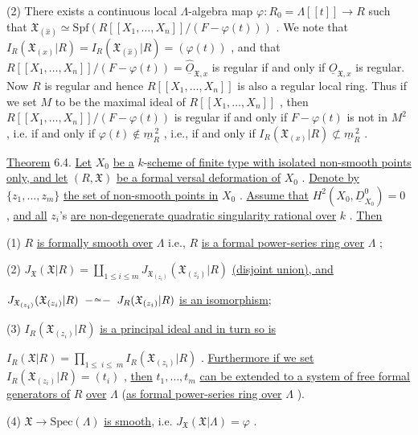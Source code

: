 (2)  There exists a continuous local $\Lambda$-algebra map $\varphi : R_0 = \Lambda[[t]] \to R$ such that $\mathfrak{X}_{(\widehat{x})} \simeq \mathrm{Spf}(R[[X_1,\ldots,X_n]]/(F - \varphi(t)))$ . We note that $I_R(\mathfrak{X}_{(x)}|R) = I_R(\mathfrak{X}_{(\widehat{x})}|R) = (\varphi(t))$ , and that $R[[X_1,\ldots,X_n]]/(F - \varphi(t)) = \hat{\underline{O}}_{\mathfrak{X},x}$ is regular if and only if $\underline{O}_{\mathfrak{X},x}$ is regular. Now $R$ is regular and hence $R[[X_1,\ldots,X_n]]$ is also a regular local ring. Thus if we set $M$ to be the maximal ideal of $R[[X_1,\ldots,X_n]]$ , then $R[[X_1,\ldots,X_n]]/(F - \varphi(t))$ is regular if and only if $F - \varphi(t)$ is not in $M^2$ , i.e. if and only if $\varphi(t) \notin \underline{m}_R^{\,2}$ , i.e., if and only if $I_R(\mathfrak{X}_{(x)}|R) \not\subset \underline{m}_R^{\,2}$ .

\underline{Theorem} 6.4.  \underline{Let} $X_0$ \underline{be a} $k$-\underline{scheme of finite type with isolated non-smooth points only, and let} $(R, \mathfrak{X})$ \underline{be a formal versal deformation of} $X_0$ . \underline{Denote by} $\{z_1,\ldots,z_m\}$ \underline{the set of non-smooth points in} $X_0$ . \underline{Assume that} $H^2(X_0, \underline{D}^0_{X_0}) = 0$ , \underline{and all} $z_i$'s \underline{are non-degenerate quadratic singularity rational over} $k$ . \underline{Then}

(1)  $R$ \underline{is formally smooth over} $\Lambda$ i.e., $R$ \underline{is a formal power-series ring over} $\Lambda$ ;

(2)  $J_{\mathfrak{X}}(\mathfrak{X}|R) = \coprod_{1\leq i\leq m} J_{\mathfrak{X}_{(z_i)}}(\mathfrak{X}_{(z_i)}|R)$  \underline{(disjoint union), and}

$J_{\mathfrak{X}_{(z_i)}}(\mathfrak{X}_{(z_i)}|R) \;\overset{\sim}{\relbar\relbar\relbar}\; J_R(\mathfrak{X}_{(z_i)}|R)$  \underline{is an isomorphism};

(3)  $I_R(\mathfrak{X}_{(z_i)}|R)$ \underline{is a principal ideal and in turn so is}

$I_R(\mathfrak{X}|R) = \prod_{1\leq\ i\leq\ m} I_R(\mathfrak{X}_{(z_i)}|R)$ . \underline{Furthermore if we set} $I_R(\mathfrak{X}_{(z_i)}|R) = (t_i)$ , \underline{then} $t_1,\ldots,t_m$ \underline{can be extended to a system of free formal generators of} $R$ \underline{over} $\Lambda$ (\underline{as formal power-series ring over} $\Lambda$ ).

(4)  $\mathfrak{X} \to \mathrm{Spec}(\Lambda)$ \underline{is smooth}, i.e. $J_{\mathfrak{X}}(\mathfrak{X}|\Lambda) = \varphi$ .


